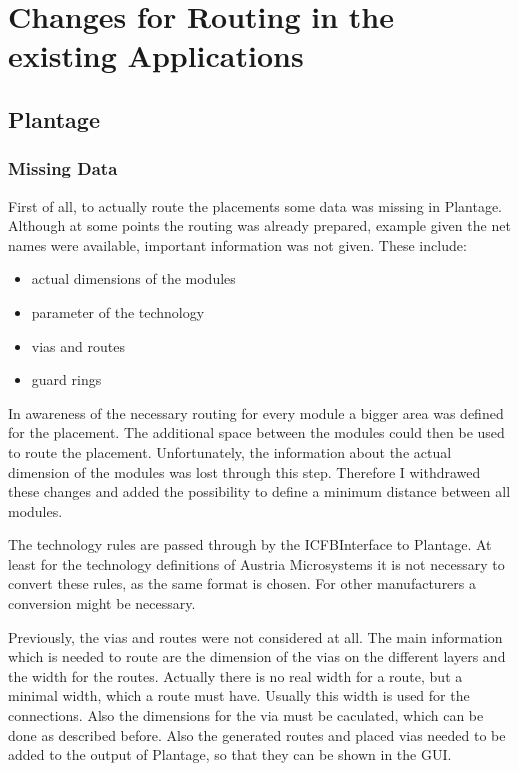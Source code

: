 \section{Changes for Routing in the existing Applications}

\subsection{Plantage}

\subsubsection{Missing Data}
First of all, to actually route the placements some data was missing in Plantage. Although at some points the routing was already prepared, example given the net names were available, important information was not given. These include:
\begin{itemize}
\item actual dimensions of the modules
\item parameter of the technology
\item vias and routes
\item guard rings
\end{itemize}

In awareness of the necessary routing for every module a bigger area was defined for the placement. The additional space between the modules could then be used to route the placement. Unfortunately, the information about the actual dimension of the modules was lost through this step. Therefore I withdrawed these changes and added the possibility to define a minimum distance between all modules.

The technology rules are passed through by the ICFBInterface to Plantage. At least for the technology definitions of Austria Microsystems it is not necessary to convert these rules, as the same format is chosen. For other manufacturers a conversion might be necessary.

Previously, the vias and routes were not considered at all. The main information which is needed to route are the dimension of the vias on the different layers and the width for the routes. Actually there is no real width for a route, but a minimal width, which a route must have. Usually this width is used for the connections. Also the dimensions for the via must be caculated, which can be done as described before. Also the generated routes and placed vias needed to be added to the output of Plantage, so that they can be shown in the GUI.

